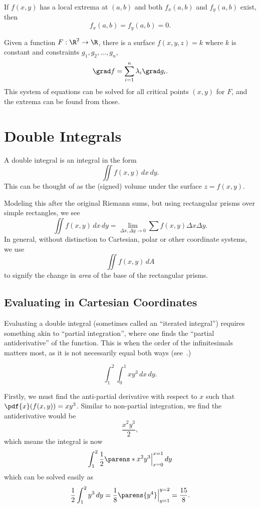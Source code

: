 \documentclass{article}
\begin{document}
\begin{prop}
  If $f(x, y)$ has a local extrema at $(a, b)$ and both $f_{x}(a, b)$ and $f_{y}(a, b)$ exist, then
  \[
    f_{x}(a, b) = f_{y}(a, b) = 0.
  \]
\end{prop}

\begin{prop}
  Given a function $F: \R^{2} \to \R$, there is a surface $f(x, y, z) = k$ where $k$ is constant and constraints $g_{1}, g_{2}, \ldots, g_{n}$,
  \[
    \grad f = \sum_{i = 1}^{n}\lambda_{i}\grad g_{i}.
  \]
  This system of equations can be solved for all critical points $(x, y)$ for $F$, and the extrema can be found from those.
\end{prop}

\section{Double Integrals}
A double integral is an integral in the form
\[ \iint f(x, y)\,dx\,dy. \]
This can be thought of as the (signed) volume under the surface $z = f(x, y)$.

\noindent
Modeling this after the original Riemann sums, but using rectangular prisms over simple rectangles, we see
\[ \iint f(x, y)\,dx\,dy = \lim_{\Delta x, \Delta y \to 0} \sum f(x, y) \Delta x \Delta y. \]
In general, without distinction to Cartesian, polar or other coordinate systems, we use
\[ \iint f(x, y)\,dA \]
to signify the change in \emph{area} of the base of the rectangular prisms.

\subsection{Evaluating in Cartesian Coordinates}
Evaluating a double integral (sometimes called an ``iterated integral'')
requires something akin to ``partial integration'', where one finds the ``partial antiderivative'' of the function.
This is when the order of the infinitesimals matters most, as it is not necessarily equal both ways (see~.)

\begin{ex}
  \[ \int_{1}^{2}\int_{0}^{1} xy^{3}\,dx\,dy. \]

  Firstly, we must find the anti-partial derivative with respect to $x$ such that $\pdf{x}(f(x, y)) = xy^{3}$.
  Similar to non-partial integration, we find the antiderivative would be
  \[ \frac{x^{2}y^{3}}{2}, \]
  which means the integral is now
  \[ \int_{1}^{2}\frac{1}{2}\parens*{x^{2}y^{3}}\Big|_{x = 0}^{x = 1}\,dy \]
  which can be solved easily as
  \[ \frac{1}{2}\int_{1}^{2}y^{3}\,dy = \frac{1}{8}\parens{y^{4}}\Big|_{y = 1}^{y = 2} = \frac{15}{8}. \]
\end{ex}
\end{document}
